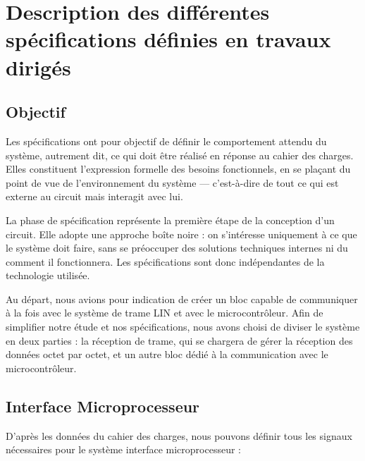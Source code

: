 \section{Description des différentes spécifications définies en travaux dirigés}

\subsection*{Objectif}

Les spécifications ont pour objectif de définir le comportement attendu du système, autrement dit, ce qui doit être réalisé en réponse au cahier des charges. Elles constituent l’expression formelle des besoins fonctionnels, en se plaçant du point de vue de l’environnement du système — c’est-à-dire de tout ce qui est externe au circuit mais interagit avec lui.
\newline

La phase de spécification représente la première étape de la conception d’un circuit. Elle adopte une approche boîte noire : on s’intéresse uniquement à ce que le système doit faire, sans se préoccuper des solutions techniques internes ni du comment il fonctionnera. Les spécifications sont donc indépendantes de la technologie utilisée.
\newline

Au départ, nous avions pour indication de créer un bloc capable de communiquer à la fois avec le système de trame LIN et avec le microcontrôleur. Afin de simplifier notre étude et nos spécifications, nous avons choisi de diviser le système en deux parties : la réception de trame, qui se chargera de gérer la réception des données octet par octet, et un autre bloc dédié à la communication avec le microcontrôleur.
\newline

    

\subsection{Interface Microprocesseur}

D'après les données du cahier des charges, nous pouvons définir tous les signaux nécessaires pour le système interface microprocesseur : 

